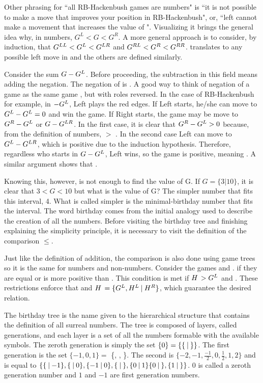 Other phrasing for ``all RB-Hackenbush games are numbers" is ``it is not possible to make a move that improves your position in  RB-Hackenbush", or, ``left cannot make a movement that increases the value of \Gm{}". Visualizing it brings the general idea why, in numbers, $G^L < G < G^R$. A more general approach is to consider, by induction, that $\mbox{$G^{LL}$} < \mbox{$G^L$} < \mbox{$G^{LR}$}$ and $\mbox{$G^{RL}$} < \mbox{$G^R$} < \mbox{$G^{RR}$}$.  translates to any possible left move in  and the others are defined similarly.

Consider the sum $\mbox{$G$} - \mbox{$G^L$}$. Before proceeding, the subtraction in this field means adding the negation. The negation of  is . A good way to think of negation of a game \Gm{} as the same game \Gm{}, but with roles reversed. In the case of RB-Hackenbush for example, in ${-}\mbox{$G^L$}$, Left plays the red edges. If Left starts, he/she can move to $\mbox{$G^L$} - \mbox{$G^L$} = 0$ and win the game. If Right starts, the game may be move to $\mbox{$G^R$} - \mbox{$G^L$}$ or $\mbox{$G$} - \mbox{$G^{LR}$}$. In the first case, it is clear that $\mbox{$G^R$} - \mbox{$G^L$} > 0$ because, from the definition of numbers,  $>$ .
In the second case Left can move to $\mbox{$G^L$} - \mbox{$G^{LR}$}$, which is positive due to the induction hypothesis. Therefore, regardless who starts in $\mbox{$G$} - \mbox{$G^L$}$, Left wins, so the game is positive, meaning . A similar argument shows that .

Knowing this, however, is not enough to find the value of G. If $G = \{3 | 10\}$, it is clear that $3 < G < 10$ but what is the value of G? The simpler number that fits this interval, 4. What is called simpler is the minimal-birthday number that fits the interval. The word birthday comes from the initial analogy used to describe the creation of all the numbers. Before visiting the birthday tree and finishing explaining the simplicity principle, it is necessary to visit the definition of the comparison $\leq$.

Just like the definition of addition, the comparison is also done using game trees so it is the same for numbers and non-numbers. Consider the games \Gm{} and \Hm. \Gm{\leq \Hm} if they are equal or \Hm is more positive than \Gm{}. This condition is met if $\mbox{$H\,$} > G^L$ and . These restrictions enforce that  and $\mbox{$H\,$} = \mbox{$\{G^L,H^L\:|\:H^R\}$}$, which guarantee the desired relation.

The birthday tree is the name given to the hierarchical structure that contains the definition of all surreal numbers. The tree is composed of layers, called generations, and each layer is a set of all the numbers formable with the available symbols. The zeroth generation is simply the set $\{0\} = \{\mbox{$\{\:|\:\}$}\}$. The first generation is the set $\{{-}1,0,1\}=$ \{, \gam{}{}, \}. The second is $\{-2,-1,\frac{-1}{2},0,\frac{1}{2},1,2\}$ and is equal to $\{\mbox{$\{\:|\:{-}1\}$},\mbox{$\{\:|\:0\}$},\mbox{$\{{-}1\:|\:0\}$},\mbox{$\{\:|\:\}$},\mbox{$\{0\:|\:1\}$}\mbox{$\{0\:|\:\}$},\mbox{$\{1\:|\:\}$}\}$. $0$ is called a zeroth generation number and $1$ and ${-}1$ are first generation numbers.

